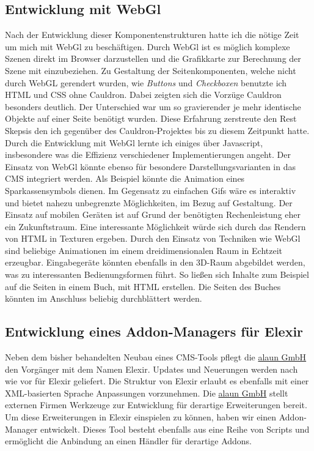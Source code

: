 \documentclass[12pt]{article}
\begin{document}
\subsection{Entwicklung mit WebGl}

Nach der Entwicklung dieser Komponentenstrukturen hatte ich die nötige Zeit um mich mit WebGl zu beschäftigen. Durch WebGl ist es möglich
komplexe Szenen direkt im Browser darzustellen und die Grafikkarte zur Berechnung der Szene mit einzubeziehen.
Zu Gestaltung der Seitenkomponenten, welche nicht durch WebGL gerendert wurden, wie \textit{Buttons}
und \textit{Checkboxen} benutzte ich HTML und CSS ohne Cauldron. Dabei zeigten sich die Vorzüge Cauldron besonders deutlich.
Der Unterschied war um so gravierender je mehr identische Objekte auf einer Seite benötigt wurden. Diese Erfahrung zerstreute den Rest Skepsis
den ich gegenüber des Cauldron-Projektes bis zu diesem Zeitpunkt hatte. Durch die Entwicklung mit WebGl lernte ich einiges über Javascript,
insbesondere was die Effizienz verschiedener Implementierungen angeht. Der Einsatz von WebGl könnte ebenso für besondere Darstellungsvarianten
in das CMS integriert werden. Als Beispiel könnte die Animation eines Sparkassensymbols dienen. Im Gegensatz zu einfachen Gifs wäre es interaktiv
und bietet nahezu unbegrenzte Möglichkeiten, im Bezug auf Gestaltung. Der Einsatz auf mobilen Geräten ist auf Grund der benötigten Rechenleistung eher ein
Zukunftstraum. Eine interessante Möglichkeit würde sich durch das Rendern von HTML in Texturen ergeben. Durch den Einsatz von Techniken wie WebGl sind beliebige Animationen im einem dreidimensionalen Raum in Echtzeit erzeugbar. 
Eingabegeräte könnten ebenfalls in den 3D-Raum abgebildet werden, was zu interessanten Bedienungsformen führt.
So ließen sich Inhalte zum Beispiel auf die Seiten in einem Buch, mit HTML erstellen. Die Seiten des Buches könnten im Anschluss
beliebig durchblättert werden.

\subsection{Entwicklung eines Addon-Managers für Elexir}

Neben dem bisher behandelten Neubau eines CMS-Tools pflegt die \href{https://alaun.de/home/}{alaun GmbH} den Vorgänger mit dem Namen Elexir.
Updates und Neuerungen werden nach wie vor für Elexir geliefert. 
Die Struktur von Elexir erlaubt es ebenfalls mit einer XML-basierten Sprache Anpassungen vorzunehmen. 
Die \href{https://alaun.de/home/}{alaun GmbH} stellt externen Firmen Werkzeuge zur Entwicklung für derartige
Erweiterungen bereit. Um diese Erweiterungen in Elexir einspielen zu können, haben wir einen Addon-Manager entwickelt. 
Dieses Tool besteht ebenfalls aus eine Reihe von Scripts und ermöglicht die Anbindung an einen Händler für derartige Addons.
\end{document}
